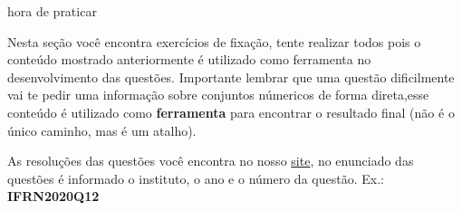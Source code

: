 \documentclass[10pt]{article}
\begin{document}
 \begin{center}
            {\LARGE {\sc hora de praticar}}
        \end{center}

Nesta seção você encontra exercícios de fixação, tente realizar todos pois o conteúdo mostrado anteriormente é utilizado como ferramenta no desenvolvimento das questões. Importante lembrar que uma questão dificilmente vai te pedir uma informação sobre conjuntos númericos de forma direta,esse conteúdo é utilizado como \textbf{ferramenta} para encontrar o resultado final (não é o único caminho, mas é um atalho).

As resoluções das questões você encontra no nosso \href{https://prepif.herokuapp.com/instituicoes}{site}, no enunciado das questões é informado o instituto, o ano e o número da questão. Ex.: \textbf{IFRN2020Q12}
\end{document}
